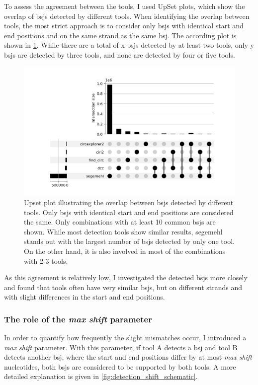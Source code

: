 To assess the agreement between the tools, I used UpSet plots, which show the
overlap of \glspl{bsj} detected by different tools.
When identifying the overlap between tools, the most strict approach is to
consider only \glspl{bsj} with identical start and end positions and on the
same strand as the same \gls{bsj}.
The according plot is shown in \cref{fig:detection_upset_0}.
While there are a total of x \glspl{bsj} detected by at least two tools, only y
\glspl{bsj} are detected by three tools, and none are detected by four or five
tools.

\begin{figure}[H]
    \centering

    \includegraphics[width=\textwidth]{chapters/4_results_and_discussion/figures/detection/upset/shift_0_stranded.png}
    \caption{Upset plot illustrating the overlap between \glspl{bsj} detected
        by
        different tools.
        Only \glspl{bsj} with identical start and end positions are considered the
        same.
        Only combinations with at least 10 common \glspl{bsj} are shown.
        While most detection tools show similar results, segemehl stands out with the
        largest number of \glspl{bsj} detected by only one tool.
        On the other hand, it is also involved in most of the combinations with 2-3
        tools.
    } \label{fig:detection_upset_0} \end{figure}

As this agreement is relatively low, I investigated the detected \glspl{bsj}
more closely and found that tools often have very similar \glspl{bsj}, but on
different strands and with slight differences in the start and end positions.

\subsubsection{The role of the \textit{max shift} parameter}
In order to quantify how frequently the slight mismatches occur, I introduced a
\textit{max shift} parameter.
With this parameter, if tool A detects a \gls{bsj} and tool B detects another
\gls{bsj}, where the start and end positions differ by at most \textit{max
    shift} nucleotides, both \glspl{bsj} are considered to be supported by both
tools.
A more detailed explanation is given in \cref{fig:detection_shift_schematic}.

